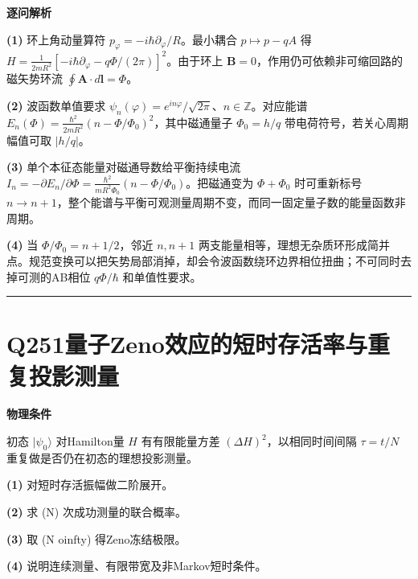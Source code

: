 \documentclass[UTF8,a4paper,11pt,oneside,openany]{ctexbook}
\begin{document}
\par\medskip\noindent\textbf{逐问解析}
\par\noindent\textbf{(1)} 环上角动量算符 \(p_\varphi=-i\hbar\partial_\varphi/R\)。最小耦合 \(p\mapsto p-qA\) 得 \(H=\frac{1}{2mR^2}[-i\hbar\partial_\varphi-q\Phi/(2\pi)]^2\)。由于环上 \(\boldsymbol B=0\)，作用仍可依赖非可缩回路的磁矢势环流 \(\oint\boldsymbol A\cdot d\boldsymbol l=\Phi\)。
\par\noindent\textbf{(2)} 波函数单值要求 \(\psi_n(\varphi)=e^{in\varphi}/\sqrt{2\pi}\)、\(n\in\mathbb Z\)。对应能谱 \(E_n(\Phi)=\frac{\hbar^2}{2mR^2}(n-\Phi/\Phi_0)^2\)，其中磁通量子 \(\Phi_0=h/q\) 带电荷符号，若关心周期幅值可取 \(|h/q|\)。
\par\noindent\textbf{(3)} 单个本征态能量对磁通导数给平衡持续电流 \(I_n=-\partial E_n/\partial\Phi=\frac{\hbar^2}{mR^2\Phi_0}(n-\Phi/\Phi_0)\)。把磁通变为 \(\Phi+\Phi_0\) 时可重新标号 \(n\to n+1\)，整个能谱与平衡可观测量周期不变，而同一固定量子数的能量函数非周期。
\par\noindent\textbf{(4)} 当 \(\Phi/\Phi_0=n+1/2\)，邻近 \(n,n+1\) 两支能量相等，理想无杂质环形成简并点。规范变换可以把矢势局部消掉，却会令波函数绕环边界相位扭曲；不可同时去掉可测的AB相位 \(q\Phi/\hbar\) 和单值性要求。

\par\bigskip\hrule\bigskip
\section*{Q251\quad 量子Zeno效应的短时存活率与重复投影测量}
\textbf{物理条件}\par 初态 \(|\psi_0\rangle\) 对Hamilton量 \(H\) 有有限能量方差 \((\Delta H)^2\)，以相同时间间隔 \(\tau=t/N\) 重复做是否仍在初态的理想投影测量。
\par\noindent\textbf{(1)} 对短时存活振幅做二阶展开。
\par\noindent\textbf{(2)} 求 (N) 次成功测量的联合概率。
\par\noindent\textbf{(3)} 取 (N	oinfty) 得Zeno冻结极限。
\par\noindent\textbf{(4)} 说明连续测量、有限带宽及非Markov短时条件。
\end{document}
